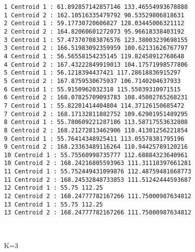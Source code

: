 \documentclass[11pt]{article}
\begin{document}
    \begin{Verbatim}[commandchars=\\\{\}]
1 Centroid 1 : 61.892857142857146 133.46554993678888
1 Centroid 2 : 162.10516335479792 90.53529806818631
2 Centroid 1 : 59.17730720606827 128.03445006321112
2 Centroid 2 : 164.82060601272073 95.96618338403192
3 Centroid 1 : 57.473707083876576 123.38003239698155
3 Centroid 2 : 166.51983092359959 100.62131626767797
4 Centroid 1 : 56.56558154235145 119.82458912768648
4 Centroid 2 : 167.43222849919013 104.17571998577806
5 Centroid 1 : 56.1218394437421 117.28618836915297
5 Centroid 2 : 167.8759530675937 106.7140204637933
6 Centroid 1 : 55.9150962032318 115.55039310971515
6 Centroid 2 : 168.07825709093783 108.45002765268231
7 Centroid 1 : 55.82201414404804 114.37126150685472
7 Centroid 2 : 168.17132811882752 109.62901951489295
8 Centroid 1 : 55.780609221287186 113.58717553632808
8 Centroid 2 : 168.21272813462906 110.41301256221854
9 Centroid 1 : 55.76414348925411 113.05578381795196
9 Centroid 2 : 168.23363489116264 110.94425789120216
10 Centroid 1 : 55.75560998735777 112.68884323640961
10 Centroid 2 : 168.24216805593963 111.31118397661281
11 Centroid 1 : 55.752449431099876 112.48759481668773
11 Centroid 2 : 168.24532848733853 111.51242444593687
12 Centroid 1 : 55.75 112.25
12 Centroid 2 : 168.24777782167266 111.75000987634812
13 Centroid 1 : 55.75 112.25
13 Centroid 2 : 168.24777782167266 111.75000987634812

    \end{Verbatim}

    \begin{center}
    \end{center}
    { \hspace*{\fill} \\}
    
    K=3
\end{document}
